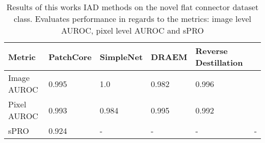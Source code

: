 \begin{table}[htbp]
    \tiny
    \centering
    \begin{tabularx}{\textwidth}{|X|X|X|X|X|}%
        \hline
        \textbf{Metric} & \textbf{PatchCore} \cite{patchCore2022} & \textbf{SimpleNet} \cite{liu2023simplenet} & \textbf{DRAEM} \cite{Zavrtanik_2021DRAEM} & \textbf{Reverse Destillation} \cite{revdist2023} \\
        \hline
        Image AUROC & 0.995 & 1.0 & 0.982 & 0.996 \\
        \hline
        Pixel AUROC & 0.993 & 0.984 & 0.995 & 0.992 \\
        \hline
        sPRO & 0.924 & - & - & - & - \\
        \hline
    \end{tabularx}
    \caption{Results of this works IAD methods on the novel flat connector dataset class. Evaluates performance in regards to the metrics: image level AUROC, pixel level AUROC and sPRO}
    \label{tab:flatconnectorperformance}
\end{table}
